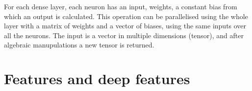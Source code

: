 For each dense layer, each neuron has an input, weights, a constant bias from which an output is calculated. This operation can be parallelised using the whole layer with a matrix of weights and a vector of biases, using the same inputs over all the neurons. The input is a vector in multiple dimensions (tensor), and after algebraic manupulations a new tensor is returned. 

\section{Features and deep features}



% 